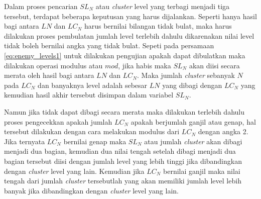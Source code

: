 Dalam proses pencarian $SL_{N}$ atau \textit{cluster} level yang terbagi menjadi tiga tersebut, terdapat beberapa keputusan yang harus dijalankan. Seperti hanya hasil bagi antara $LN$ dan $LC_{N}$ harus bernilai bilangan tidak bulat, maka harus dilakukan proses pembulatan jumlah level terlebih dahulu dikarenakan nilai level tidak boleh bernilai angka yang tidak bulat. Sepeti pada persamaan \ref{eq:enemy_levels1} untuk dilakukan pengujian apakah dapat dibulatkan maka dilakukan operasi modulus atau $mod$, jika habis maka $SL_{N}$ akan diisi secara merata oleh hasil bagi antara $LN$ dan $LC_{N}$. Maka jumlah \textit{cluster} sebanyak $N$ pada $LC_{N}$ dan banyaknya level adalah sebesar $LN$ yang dibagi dengan $LC_{N}$ yang kemudian hasil akhir tersebut disimpan dalam variabel $SL_{N}$. 
\vspace{1ex}

Namun jika tidak dapat dibagi secara merata maka dilakukan terlebih dahulu proses pengecekkan apakah jumlah $LC_{N}$ apakah berjumlah ganjil atau genap, hal tersebut dilakukan dengan cara melakukan modulus dari $LC_{N}$ dengan angka 2. Jika ternyata $LC_{N}$ bernilai genap maka $SL_{N}$ atau jumlah \textit{cluster} akan dibagi menjadi dua bagian, kemudian dua nilai tengah setelah dibagi menjadi dua bagian tersebut diisi dengan jumlah level yang lebih tinggi jika dibandingkan dengan \textit{cluster} level yang lain. Kemudian jika $LC_{N}$ bernilai ganjil maka nilai tengah dari jumlah \textit{cluster} tersebutlah yang akan memiliki jumlah level lebih banyak jika dibandingkan dengan \textit{cluster} level yang lain.
\vspace{1ex}


